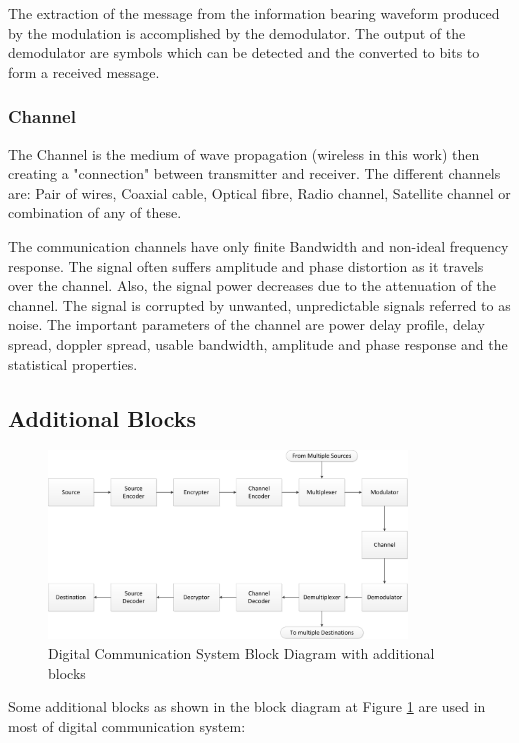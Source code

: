 The extraction of the message from the information bearing waveform produced by
the modulation is accomplished by the demodulator. The output of the demodulator
are symbols which can be detected and the converted to bits to form a received
message.

\subsubsection{Channel}

The Channel is the medium of wave propagation (wireless in this work) then
creating a "connection" between transmitter and receiver. The different channels
are: Pair of wires, Coaxial cable, Optical fibre, Radio channel, Satellite
channel or combination of any of these.

The communication channels have only finite Bandwidth and non-ideal frequency
response. The signal often suffers amplitude and phase distortion as it travels
over the channel. Also, the signal power decreases due to the attenuation of the
channel. The signal is corrupted by unwanted, unpredictable signals referred to
as noise. The important parameters of the channel are power delay profile, delay
spread, doppler spread, usable bandwidth, amplitude and phase response and the
statistical properties.

\subsection{Additional Blocks}

\begin{figure}[htbp]
    \centering
    \includegraphics[width=0.85\textwidth]{./figures/digicom_plus}
    \caption{ Digital Communication System Block Diagram with additional blocks
    \label{fig:digicomplus}}
\end{figure}

Some additional blocks as shown in the block diagram  at Figure \ref{fig:digicomplus}
are used in most of digital communication system:

